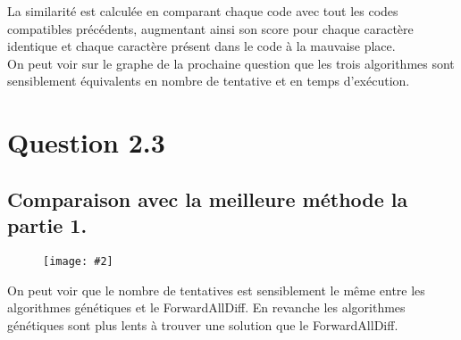 \documentclass[a4paper, 12pt]{report}
\newcommand{\cfigure}[3][6cm]{
	\begin{figure}[H]
		\centering
		\texttt{[image: \#2]}
		\caption{#3}
	\end{figure}
}
\begin{document}
La similarité est calculée en comparant chaque code avec tout les codes compatibles précédents, augmentant ainsi son score pour chaque caractère identique et chaque caractère présent dans le code à la mauvaise place. \\

On peut voir sur le graphe de la prochaine question que les trois algorithmes sont sensiblement équivalents en nombre de tentative et en temps d'exécution. 

\section*{Question 2.3}

\subsection*{Comparaison avec la meilleure méthode la partie 1.}

\cfigure[7cm]{Figure_1.png}{}

On peut voir que le nombre de tentatives est sensiblement le même entre les algorithmes génétiques et le ForwardAllDiff. En revanche les algorithmes génétiques sont plus lents à trouver une solution que le ForwardAllDiff.
\end{document}
